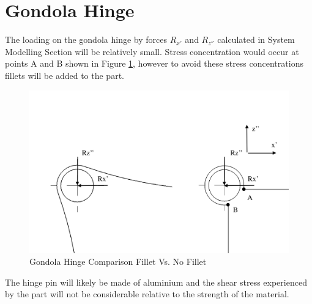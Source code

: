 \documentclass[../main.tex]{subfiles}
\begin{document}
\section{Gondola Hinge} \label{appendix:gondolaHinge}

The loading on the gondola hinge by forces $R_{x'}$ and $R_{z''}$ calculated in System Modelling Section will be relatively small. Stress concentration would occur at points A and B shown in Figure \ref{fig:fillethinge}, however to avoid these stress concentrations fillets will be added to the part. 

\begin{figure}[H]
	\centering
	\includegraphics[width=1\textwidth]{img/gondola/filletHinge.PNG}
	\caption{Gondola Hinge Comparison Fillet Vs. No Fillet}
	\label{fig:fillethinge}
\end{figure}

The hinge pin will likely be made of aluminium and the shear stress experienced by the part will not be considerable relative to the strength of the material. 
\end{document}
